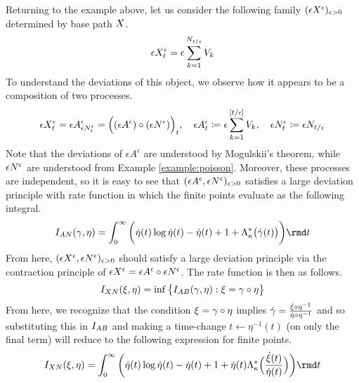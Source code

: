 \begin{example}
  \label{example:compound-poisson}
  Returning to the example above, let us consider the following family $(\epsilon X^\epsilon)_{\epsilon>0}$ determined by base path $X$.
  \begin{equation*}
    \epsilon X^\epsilon_t = \epsilon\sum_{k=1}^{N_{t/\epsilon}} V_k
  \end{equation*}
  To understand the deviations of this object, we observe how it appears to be a composition of two processes.
  \begin{equation*}
    \epsilon X^\epsilon_t = \epsilon A^\epsilon_{\epsilon N^\epsilon_t} = \Big((\epsilon A^\epsilon) \circ (\epsilon N^\epsilon)\Big)_t, \quad
    \epsilon A^\epsilon_t \coloneqq \epsilon \sum_{k=1}^{[t/\epsilon]} V_k, \quad
    \epsilon N^\epsilon_t \coloneqq \epsilon N_{t/\epsilon}
  \end{equation*}
  Note that the deviations of $\epsilon A^\epsilon$ are understood by Mogulskii's theorem, while $\epsilon N^\epsilon$ are understood from Example \ref{example:poisson}.
  Moreover, these processes are independent, so it is easy to see that $(\epsilon A^\epsilon, \epsilon N^\epsilon)_{\epsilon>0}$ satisfies a large deviation principle with rate function in which the finite points evaluate as the following integral.
  \begin{equation*}
    \rf_{A\N}(\gamma, \eta) = \int_0^\infty \bigg( \dot\eta(t)\log\dot\eta(t) - \dot\eta(t) + 1 + \ode_\affDist^*\big(\dot\gamma(t)\big) \bigg) \rmd t
  \end{equation*}
  From here, $(\epsilon X^\epsilon, \epsilon N^\epsilon)_{\epsilon>0}$ should satisfy a large deviation principle via the contraction principle of $\epsilon X^\epsilon = \epsilon A^\epsilon \circ \epsilon N^\epsilon$.
  The rate function is then as follows.
  \begin{equation*}
    I_{XN}(\xi, \eta) = \inf\big\{ I_{AB}(\gamma, \eta) : \xi = \gamma \circ \eta \big\}
  \end{equation*}
  From here, we recognize that the condition $\xi = \gamma \circ \eta$ implies $\dot\gamma = \frac{\dot{\xi} \circ \eta^{-1} }{\dot\eta \circ \eta^{-1}}$ and so substituting this in $I_{AB}$ and making a time-change $t \leftarrow \eta^{-1}(t)$ (on only the final term) will reduce to the following expression for finite points.
  \begin{equation}
    \label{eq:rf-compound-poisson}
    \rf_{\X\N}(\pathVar, \eta) =
      \int_0^\infty \bigg( \dot\eta(t)\log\dot\eta(t) - \dot\eta(t) + 1 + \dot\eta(t) \ode_\affDist^*\Big( \frac{\dot\pathVar(t)}{\dot\eta(t)} \Big) \bigg) \rmd t

\end{equation}
\end{example}

